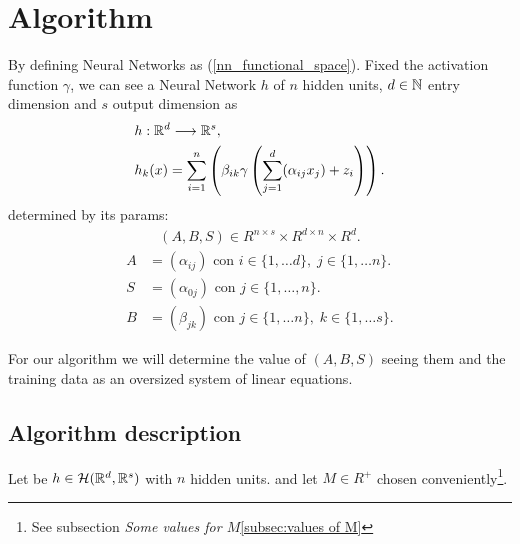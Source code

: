 \section*{Algorithm} 

By defining Neural Networks as (\ref{nn_functional_space}).  Fixed the activation function 
$\gamma$, we can see a Neural Network $h$ of $n$ hidden 
units, $d \in \mathbb{N}$ entry dimension and $s$ output
dimension as 
\begin{align}
    &h: \mathbb{R}^d \longrightarrow \mathbb{R}^s,\\
    &h_k(x) = \sum_{i= 1}^n 
        \left(
            \beta_{i k} 
            \gamma
            \left( 
                \sum_{j = 1}^d
                (
                    \alpha_{i j} x_j
                ) + z_i
            \right)
        \right).
\end{align}
determined by its params: 
\begin{align}
    (A,B,S) \in R^{n \times s} \times R^{d \times n} \times R^{d}.
\end{align} 
\begin{align*}\label{eq:representation red neuronal}
    A &= (\alpha_{i j}) \text{ con }  i \in \{1, \ldots d\}, \; j \in \{1, \ldots n\}. \\
    S &= (\alpha_{0 j}) \text{ con }  j \in \{1, \ldots, n\}. \\
    B &= (\beta_{j k}) \text{ con }  j \in \{1, \ldots n\}, \; k \in \{1, \ldots s\}.
\end{align*}

For our algorithm we will determine the value of 
$(A,B,S)$ seeing them and the training data as an oversized system of linear equations. 

\subsection*{Algorithm description}  

Let be $h \in  \mathcal{H}(\mathbb{R}^d, \mathbb{R}^s)$
 with $n$ hidden units. 
and let $M \in R^+$ chosen
 conveniently\footnote{See subsection \textit{Some values for $M$}\ref{subsec:values of M}}. 

